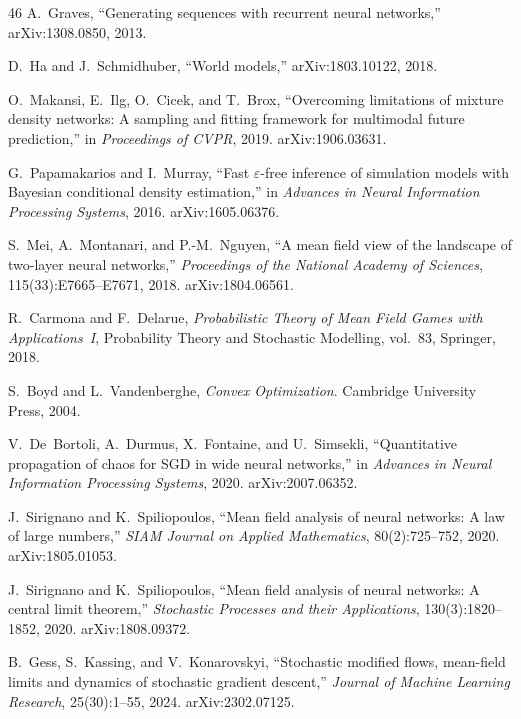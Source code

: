\documentclass[11pt]{article}
\begin{document}
\begin{thebibliography}{46}
A.~Graves,
``Generating sequences with recurrent neural networks,''
arXiv:1308.0850, 2013.

D.~Ha and J.~Schmidhuber,
``World models,''
arXiv:1803.10122, 2018.

O.~Makansi, E.~Ilg, O.~Cicek, and T.~Brox,
``Overcoming limitations of mixture density networks: A sampling and
fitting framework for multimodal future prediction,''
in \emph{Proceedings of CVPR}, 2019.
arXiv:1906.03631.

G.~Papamakarios and I.~Murray,
``Fast $\varepsilon$-free inference of simulation models with
{B}ayesian conditional density estimation,''
in \emph{Advances in Neural Information Processing Systems}, 2016.
arXiv:1605.06376.

S.~Mei, A.~Montanari, and P.-M.~Nguyen,
``A mean field view of the landscape of two-layer neural networks,''
\emph{Proceedings of the National Academy of Sciences},
115(33):E7665--E7671, 2018.
arXiv:1804.06561.

R.~Carmona and F.~Delarue,
\emph{Probabilistic Theory of Mean Field Games with Applications~I},
Probability Theory and Stochastic Modelling, vol.~83,
Springer, 2018.

S.~Boyd and L.~Vandenberghe,
\emph{Convex Optimization}.
Cambridge University Press, 2004.

V.~De~Bortoli, A.~Durmus, X.~Fontaine, and U.~Simsekli,
``Quantitative propagation of chaos for {SGD} in wide neural networks,''
in \emph{Advances in Neural Information Processing Systems}, 2020.
arXiv:2007.06352.

J.~Sirignano and K.~Spiliopoulos,
``Mean field analysis of neural networks: A law of large numbers,''
\emph{SIAM Journal on Applied Mathematics}, 80(2):725--752, 2020.
arXiv:1805.01053.

J.~Sirignano and K.~Spiliopoulos,
``Mean field analysis of neural networks: A central limit theorem,''
\emph{Stochastic Processes and their Applications}, 130(3):1820--1852,
2020.
arXiv:1808.09372.

B.~Gess, S.~Kassing, and V.~Konarovskyi,
``Stochastic modified flows, mean-field limits and dynamics of
stochastic gradient descent,''
\emph{Journal of Machine Learning Research}, 25(30):1--55, 2024.
arXiv:2302.07125.


\end{thebibliography}
\end{document}
